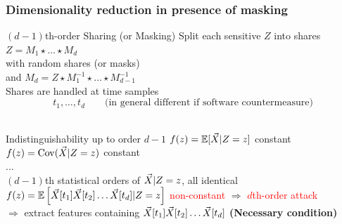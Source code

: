 



\begin{frame}
\frametitle{Dimensionality reduction in presence of masking}
\begin{block}{$(d-1)$th-order Sharing (or Masking)} 
Split each sensitive $Z$ into shares  $Z = M_1 \star \dots \star M_d$ \\
with  random shares (or masks)  \\ and $M_d = Z \star M_1^{-1}\star \dots \star M_{d-1}^{-1}$ \\
Shares are handled at time samples $$t_1,\dots, t_d \qquad \text{(in general different if software countermeasure)} $$
\\
\end{block}

\begin{block}{Indistinguishability up to order $d-1$}
$f(z) = \mathbb{E}[\vec{X}\lvert Z=z]$ constant\\
$f(z) = \mathrm{Cov}(\vec{X}\lvert Z=z)$ constant \\
...\\
$(d-1)$th statistical orders of $\vec{X}\lvert Z=z$, all identical\\
\pause
\textcolor{red}{$f(z) = \mathbb{E}\left[\vec{X}[t_1]\vec{X}[t_2]\dots\vec{X}[t_d]\lvert Z=z\right]$ non-constant} $\Rightarrow$ \textcolor{red}{$d$th-order attack} \\
\pause
$\Rightarrow$ extract features containing $\vec{X}[t_1]\vec{X}[t_2]\dots\vec{X}[t_d]$ \textbf{(Necessary condition)}
\end{block}

\end{frame}



